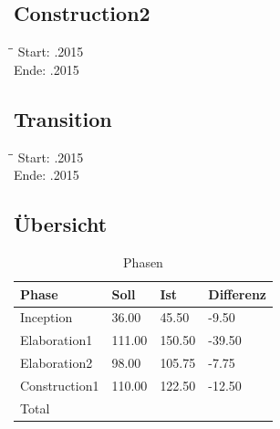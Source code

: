 \subsection{Construction2}
\begin{tabbing}[H]
    \hspace*{6cm}\=\hspace*{6cm}\= \kill
    Start: .2015 \\
	Ende: .2015 \\
\end{tabbing}

\subsection{Transition}
\begin{tabbing}[H]
    \hspace*{6cm}\=\hspace*{6cm}\= \kill
    Start: .2015 \\
	Ende: .2015 \\
\end{tabbing}

\subsection{Übersicht}
\begin{table}[H]
    \begin{tabular}{|p{5cm}|p{2cm}|p{2cm}|p{2cm}|}
    \hline    
    \rowcolor{lightblue}
	Phase & Soll & Ist & Differenz \\ \hline
	Inception & 36.00 &	45.50 &	-9.50 \\ \hline
	Elaboration1 & 111.00 & 150.50	& -39.50 \\ \hline
	Elaboration2 & 98.00 & 105.75 & -7.75 \\ \hline
	Construction1 & 110.00 & 122.50 & -12.50 \\ \hline
	\rowcolor{lightblue}
	Total & & & \\ \hline
    \end{tabular}
    \caption[Phasen]{Phasen}
\end{table}

\newpage